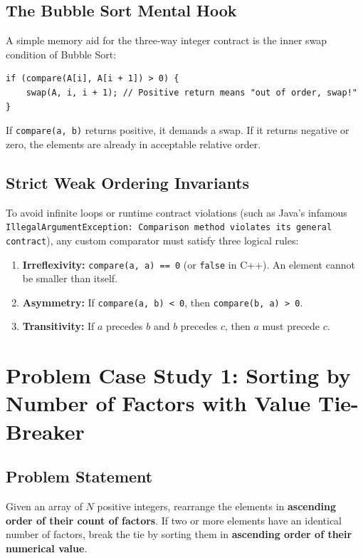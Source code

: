 \documentclass[10pt,journal,compsoc,onecolumn]{IEEEtran}
\begin{document}
\subsection{The Bubble Sort Mental Hook}

A simple memory aid for the three-way integer contract is the inner swap condition of Bubble Sort:
\begin{verbatim}
if (compare(A[i], A[i + 1]) > 0) {
    swap(A, i, i + 1); // Positive return means "out of order, swap!"
}
\end{verbatim}
If \texttt{compare(a, b)} returns positive, it demands a swap. If it returns negative or zero, the elements are already in acceptable relative order.

\subsection{Strict Weak Ordering Invariants}

To avoid infinite loops or runtime contract violations (such as Java's infamous \texttt{IllegalArgumentException: Comparison method violates its general contract}), any custom comparator must satisfy three logical rules:
\begin{enumerate}
    \item \textbf{Irreflexivity:} \texttt{compare(a, a) == 0} (or \texttt{false} in C++). An element cannot be smaller than itself.
    \item \textbf{Asymmetry:} If \texttt{compare(a, b) < 0}, then \texttt{compare(b, a) > 0}.
    \item \textbf{Transitivity:} If $a$ precedes $b$ and $b$ precedes $c$, then $a$ must precede $c$.
\end{enumerate}

\section{Problem Case Study 1: Sorting by Number of Factors with Value Tie-Breaker}
\label{sec:factors}

\subsection{Problem Statement}

Given an array of $N$ positive integers, rearrange the elements in \textbf{ascending order of their count of factors}. If two or more elements have an identical number of factors, break the tie by sorting them in \textbf{ascending order of their numerical value}.
\end{document}
